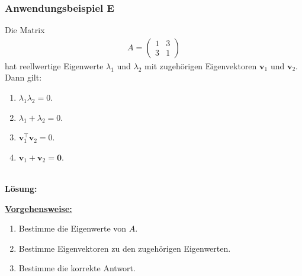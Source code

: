 \subsubsection*{Anwendungsbeispiel E}
Die Matrix
\begin{align*}
A 
= 
\begin{pmatrix}
1 & 3 \\
3 & 1
\end{pmatrix}
\end{align*}
hat reellwertige Eigenwerte $\lambda_1$ und $\lambda_2$
mit zugehörigen Eigenvektoren $\textbf{v}_1$ und $\textbf{v}_2$.
Dann gilt:
\renewcommand{\labelenumi}{(\alph{enumi})}
\begin{enumerate}
\item 
$\lambda_1 \lambda_2 = 0$.
\item
$\lambda_1 +  \lambda_2 = 0$.
\item
$\textbf{v}_1^\top \textbf{v}_2  = 0 $.
\item
$\textbf{v}_1 +  \textbf{v}_2  = \textbf{0} $.
\end{enumerate}
\ \\
\textbf{Lösung:}
\begin{mdframed}
\underline{\textbf{Vorgehensweise:}}
\renewcommand{\labelenumi}{\theenumi.}
\begin{enumerate}
\item Bestimme die Eigenwerte von $A$.
\item Bestimme Eigenvektoren zu den zugehörigen Eigenwerten.
\item Bestimme die korrekte Antwort.
\end{enumerate}
\end{mdframed}

